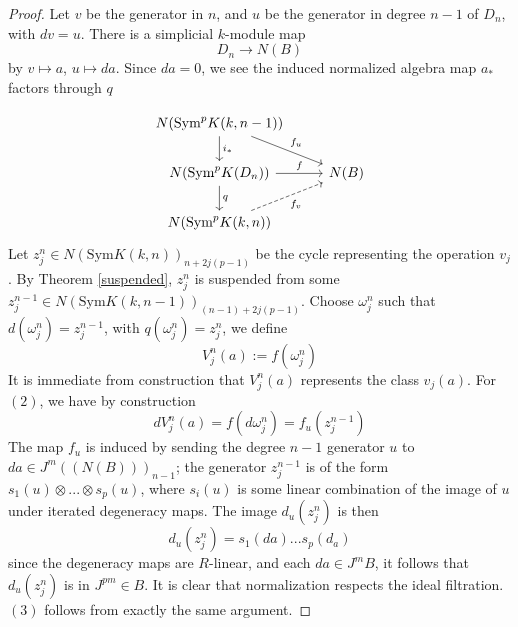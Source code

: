 \documentclass{article}
\theoremstyle{definition}
\theoremstyle{definition}
\theoremstyle{definition}
\theoremstyle{definition}
\theoremstyle{definition}
\theoremstyle{definition}
\theoremstyle{definition}
\theoremstyle{definition}
\begin{document}
\begin{proof}
    Let $v$ be the generator in $n$, and $u$ be the generator in degree $n-1$ of $D_n$, with $dv=u$. There is a simplicial $k$-module map 
    \[D_n\to N(B)\]
    by $v\mapsto a$, $u\mapsto da$. Since $da=0$, we see the induced normalized algebra map $a_*$ factors through $q$


\[\begin{tikzcd}
	{N(\textrm{Sym}^pK(k,n-1))} & \\
	{N(\textrm{Sym}^pK(D_n))} & {N(B)} \\
	{N(\textrm{Sym}^pK(k,n))}
	\arrow["{{i_*}}", from=1-1, to=2-1]
	\arrow["{f_{u}}", from=1-1, to=2-2]
	\arrow["{f_{}}", from=2-1, to=2-2]
	\arrow["q", from=2-1, to=3-1]
	\arrow["{{f_v}}"', dashed, from=3-1, to=2-2]
\end{tikzcd}\]
Let $z^n_j\in N(\textrm{Sym}K(k,n))_{n+2j(p-1)}$ be the cycle representing the operation $v_j$. By Theorem \ref{suspended}, $z^n_j$ is suspended from some $z_j^{n-1}\in  N(\textrm{Sym}K(k,n-1))_{(n-1)+2j(p-1)}$. Choose $\omega_j^n$ such that $d(\omega_j^n)=z_j^{n-1}$, with $q(\omega_j^n)=z_j^n$, we define 
\[V_j^n(a):= f(\omega_j^n)\]
It is immediate from construction that $V_j^n(a)$ represents the class $v_j(a)$. For $(2)$, we have by construction
\[dV_j^n(a)=f(d\omega_j^n)=f_u(z_j^{n-1})\]
The map $f_u$ is induced by sending the degree $n-1$ generator $u$ to $da\in J^m((N(B)))_{n-1}$; the generator $z_j^{n-1}$ is of the form $ s_1(u)\otimes ... \otimes s_p(u) $, where $s_i(u)$ is some linear combination of the image of $u$ under iterated degeneracy maps. The image $d_u(z_j^n)$ is then 
\[d_u(z_j^n)=s_1(da)...s_p(d_a)\]
since the degeneracy maps are $R$-linear, and each $da\in J^mB$, it follows that $d_u(z_j^n)$ is in $J^{pm}\in B$. It is clear that normalization respects the ideal filtration. $(3)$ follows from exactly the same argument.




















\end{proof}
\end{document}
